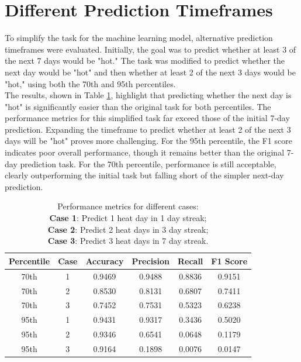 \documentclass[conference,9pt]{IEEEtran}
\begin{document}
\section{Different Prediction Timeframes}
To simplify the task for the machine learning model, alternative prediction timeframes were evaluated. Initially, the goal was to predict whether at least 3 of the next 7 days would be "hot." The task was modified to predict whether the next day would be "hot" and then whether at least 2 of the next 3 days would be "hot," using both the 70th and 95th percentiles. \\
The results, shown in Table \ref{tab:timeframe}, highlight that predicting whether the next day is "hot" is significantly easier than the original task for both percentiles. The performance metrics for this simplified task far exceed those of the initial 7-day prediction. Expanding the timeframe to predict whether at least 2 of the next 3 days will be "hot" proves more challenging. For the 95th percentile, the F1 score indicates poor overall performance, though it remains better than the original 7-day prediction task. For the 70th percentile, performance is still acceptable, clearly outperforming the initial task but falling short of the simpler next-day prediction.
\begin{table}[!t]
    \centering
    \caption{Performance metrics for different cases:\\
    \textbf{Case 1}: Predict 1 heat day in 1 day streak;\\
    \textbf{Case 2}: Predict 2 heat days in 3 day streak;\\
    \textbf{Case 3}: Predict 3 heat days in 7 day streak.}
    \label{tab:timeframe}
    \begin{tabular}{|c|c|c|c|c|c|}
        \hline
        \textbf{Percentile} & \textbf{Case} & \textbf{Accuracy} & \textbf{Precision} & \textbf{Recall} & \textbf{F1 Score} \\
        \hline
        70th & 1 & 0.9469 & 0.9488 & 0.8836 & 0.9151 \\
        70th & 2 & 0.8530 & 0.8131 & 0.6807 & 0.7411 \\
        70th & 3 & 0.7452 & 0.7531 & 0.5323 & 0.6238 \\
        \hline
        95th & 1 & 0.9431 & 0.9317 & 0.3436 & 0.5020 \\
        95th & 2 & 0.9346 & 0.6541 & 0.0648 & 0.1179 \\
        95th & 3 & 0.9164 & 0.1898 & 0.0076 & 0.0147 \\
        \hline
    \end{tabular}
\end{table}
\end{document}
